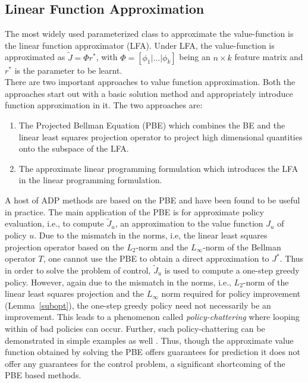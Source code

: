 \documentclass[12pt,draftcls,onecolumn]{IEEEtran}
\begin{document}
\subsection{Linear Function Approximation}
The most widely used parameterized class to approximate the value-function is the linear function approximator (LFA). Under LFA, the value-function is approximated as $\tilde{J}=\Phi r^*$, with $\Phi=[\phi_1|\ldots|\phi_k]$ being an $n\times k$ feature matrix and $r^*$ is the parameter to be learnt.\\
There are two important approaches to value function approximation. Both the approaches start out with a basic solution method and appropriately introduce function approximation in it. The two approaches are:
\begin{enumerate}
\item The Projected Bellman Equation (PBE) which combines the BE and the linear least squares projection operator to project high dimensional quantities onto the subspace of the LFA.
\item The approximate linear programming formulation which introduces the LFA in the linear programming formulation. 
\end{enumerate}
A host of ADP methods are based on the PBE and have been found to be useful in practice. The main application of the PBE is for approximate policy evaluation, i.e., to compute $\tilde{J}_u$, an approximation to the value function $J_u$ of policy $u$. Due to the mismatch in the norms, i.e, the linear least squares projection operator based on the $L_2$-norm and the $L_\infty$-norm of the Bellman operator $T$, one cannot use the PBE to obtain a direct approximation to $J^*$. Thus in order to solve the problem of control, $\tilde{J}_u$ is used to compute a one-step greedy policy. However, again due to the mismatch in the norms, i.e., $L_2$-norm of the linear least squares projection and the $L_\infty$ norm required for policy improvement (Lemma~\ref{subopt}), the one-step greedy policy need not necessarily be an improvement. This leads to a phenomenon called \emph{policy-chattering} \cite{dpchapter} where looping within of bad policies can occur. Further, such policy-chattering can be demonstrated in simple examples as well \cite{dpchapter}. Thus, though the approximate value function obtained by solving the PBE offers guarantees for prediction it does not offer any guarantees for the control problem, a significant shortcoming of the PBE based methods.\\
\end{document}
